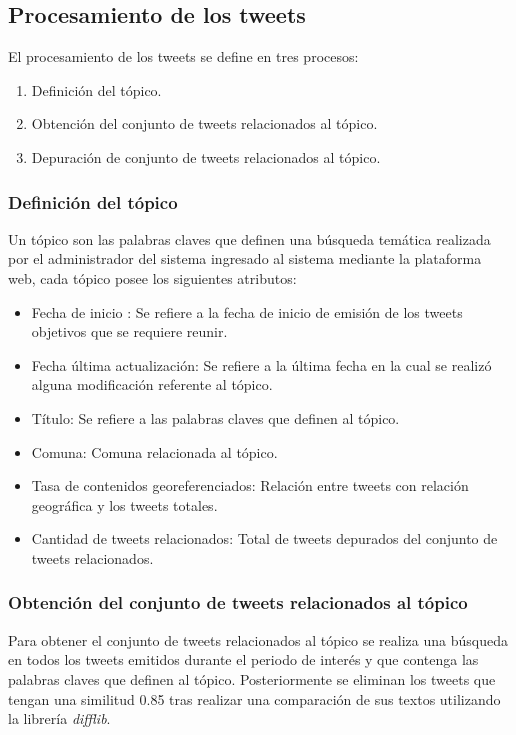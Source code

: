 \subsection{Procesamiento de los tweets}

El procesamiento de los tweets se define en tres procesos:
\begin{enumerate}
	\item{Definición del tópico.}
	\item{Obtención del conjunto de tweets relacionados al tópico.}
	\item{Depuración de conjunto de tweets relacionados al tópico.}
\end{enumerate}

\subsubsection{Definición del tópico}

Un tópico son las palabras claves que definen una búsqueda temática realizada por el administrador del sistema ingresado al sistema mediante la plataforma web, cada tópico posee los siguientes atributos:
\begin{itemize}
	\item Fecha de inicio : Se refiere a la fecha de inicio de emisión de los tweets objetivos que se requiere reunir.
	\item Fecha última actualización: Se refiere a la última fecha en la cual se realizó alguna modificación referente al tópico.
	\item Título: Se refiere a las palabras claves que definen al tópico. 
	\item Comuna: Comuna relacionada al tópico.
	\item Tasa de contenidos georeferenciados: Relación entre tweets con relación geográfica y los tweets totales.
	\item Cantidad de tweets relacionados: Total de tweets depurados del conjunto de tweets relacionados. 
\end{itemize}

\subsubsection{Obtención del conjunto de tweets relacionados al tópico}

Para obtener el conjunto de tweets relacionados al tópico se realiza una búsqueda en todos los tweets emitidos durante el periodo de interés
y que contenga las palabras claves que definen al tópico. Posteriormente se eliminan los tweets que tengan una similitud 0.85 tras realizar 
una comparación de sus textos utilizando la librería \emph{difflib}.


